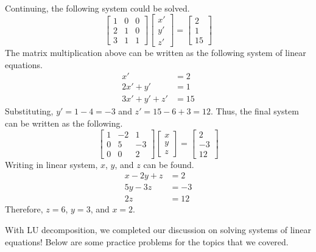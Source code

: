 \documentclass[../main.tex]{subfiles}
\begin{document}
\begin{solution}
\begin{align*}
\end{align*}
Continuing, the following system could be solved.
\[
\begin{bmatrix}
    1 & 0 & 0 \\
    2 & 1 & 0 \\
    3 & 1 & 1
\end{bmatrix}
\begin{bmatrix}
    x' \\
    y' \\
    z'
\end{bmatrix}
=
\begin{bmatrix}
    2 \\
    1 \\
    15
\end{bmatrix}
\]
The matrix multiplication above can be written as the following
system of linear equations.
\begin{align*}
    x' &= 2 \\
    2x' + y' &= 1 \\
    3x' + y' + z' &= 15
\end{align*}
Substituting, $y' = 1 - 4 = -3$ and $z' = 15 - 6 + 3 = 12$. Thus,
the final system can be written as the following.
\[
\begin{bmatrix}
    1 & -2 & 1 \\
    0 & 5  & -3 \\
    0 & 0  & 2
\end{bmatrix}
\begin{bmatrix}
    x \\
    y \\
    z
\end{bmatrix}
=
\begin{bmatrix}
    2 \\
    -3 \\
    12
\end{bmatrix}
\]
Writing in linear system, $x$, $y$, and $z$ can be found.
\begin{align*}
    x - 2y + z &= 2 \\
    5y - 3z &= -3 \\
    2z &= 12
\end{align*}
Therefore, $z = 6$, $y = 3$, and $x = 2$.
\end{solution}

With LU decomposition, we completed our discussion on solving
systems of linear equations! Below are some practice problems
for the topics that we covered.
\end{document}
